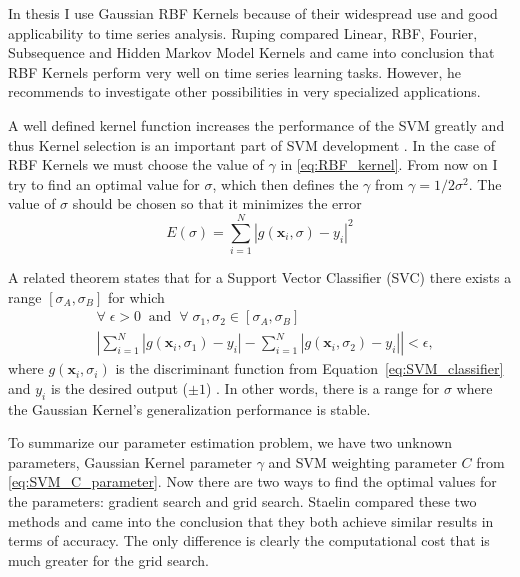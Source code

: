 In thesis I use Gaussian RBF Kernels because of their widespread use and good applicability to time series analysis. Ruping \cite{Ruping01} compared Linear, RBF, Fourier, Subsequence and Hidden Markov Model Kernels and came into conclusion that RBF Kernels perform very well on time series learning tasks. However, he recommends to investigate other possibilities in very specialized applications.

A well defined kernel function increases the performance of the SVM greatly and thus Kernel selection is an important part of SVM development \cite{Fong04}. In the case of RBF Kernels we must choose the value of $\gamma$ in \ref{eq:RBF_kernel}. From now on I try to find an optimal value for $\sigma$, which then defines the $\gamma$ from $\gamma = 1 / 2\sigma^2$. The value of $\sigma$ should be chosen so that it minimizes the error
\begin{equation}
E(\sigma) = \sum_{i=1}^N \left | g(\mathbf{x}_i, \sigma) - y_i \right |^2 \label{eq:SVM_error}
\end{equation}

A related theorem states that for a Support Vector Classifier (SVC) there exists a range $[\sigma_A, \sigma_B]$ for which
\begin{align}
&\forall \; \epsilon > 0 \;\; \text{and} \;\; \forall \; \sigma_1, \sigma_2 \in [\sigma_A, \sigma_B] \\
& \left | \sum_{i=1}^N \left | g(\mathbf{x}_i, \sigma_1) - y_i \right | - \sum_{i=1}^N \left | g(\mathbf{x}_i, \sigma_2) - y_i \right | \right | < \epsilon,
\end{align}
where $g(\mathbf{x}_i, \sigma_i)$ is the discriminant function from Equation~\ref{eq:SVM_classifier} and $y_i$ is the desired output ($\pm 1$) \cite{Wenjian08}. In other words, there is a range for $\sigma$ where the Gaussian Kernel's generalization performance is stable. 

To summarize our parameter estimation problem, we have two unknown parameters, Gaussian Kernel parameter $\gamma$ and SVM weighting parameter $C$ from \ref{eq:SVM_C_parameter}. Now there are two ways to find the optimal values for the parameters: gradient search and grid search. Staelin \cite{Staelin03} compared these two methods and came into the conclusion that they both achieve similar results in terms of accuracy. The only difference is clearly the computational cost that is much greater for the grid search. 


